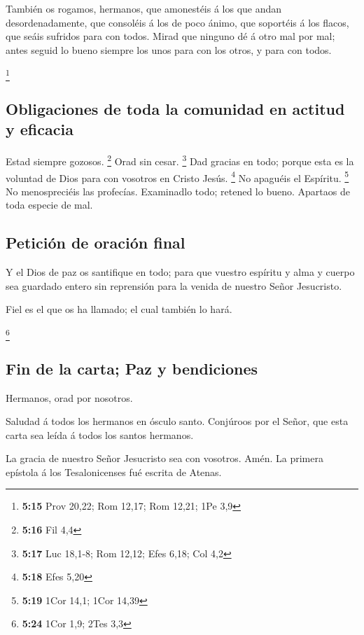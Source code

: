  También os rogamos, hermanos, que amonestéis á los que
andan desordenadamente, que consoléis á los de poco ánimo, que soportéis
á los flacos, que seáis sufridos para con todos.  Mirad que
ninguno dé á otro mal por mal; antes seguid lo bueno siempre los unos
para con los otros, y para con todos.

\footnote{\textbf{5:15} Prov 20,22; Rom 12,17; Rom 12,21; 1Pe 3,9}

\hypertarget{obligaciones-de-toda-la-comunidad-en-actitud-y-eficacia}{%
\subsection{Obligaciones de toda la comunidad en actitud y
eficacia}\label{obligaciones-de-toda-la-comunidad-en-actitud-y-eficacia}}

 Estad siempre gozosos. \footnote{\textbf{5:16} Fil 4,4}
 Orad sin cesar. \footnote{\textbf{5:17} Luc 18,1-8; Rom
  12,12; Efes 6,18; Col 4,2}  Dad gracias en todo; porque
esta es la voluntad de Dios para con vosotros en Cristo Jesús.
\footnote{\textbf{5:18} Efes 5,20}  No apaguéis el
Espíritu. \footnote{\textbf{5:19} 1Cor 14,1; 1Cor 14,39} 
No menospreciéis las profecías.  Examinadlo todo; retened
lo bueno.  Apartaos de toda especie de mal.

\hypertarget{peticiuxf3n-de-oraciuxf3n-final}{%
\subsection{Petición de oración
final}\label{peticiuxf3n-de-oraciuxf3n-final}}

 Y el Dios de paz os santifique en todo; para que vuestro
espíritu y alma y cuerpo sea guardado entero sin reprensión para la
venida de nuestro Señor Jesucristo.

 Fiel es el que os ha llamado; el cual también lo hará.

\footnote{\textbf{5:24} 1Cor 1,9; 2Tes 3,3}

\hypertarget{fin-de-la-carta-paz-y-bendiciones}{%
\subsection{Fin de la carta; Paz y
bendiciones}\label{fin-de-la-carta-paz-y-bendiciones}}

 Hermanos, orad por nosotros.

 Saludad á todos los hermanos en ósculo santo.
 Conjúroos por el Señor, que esta carta sea leída á todos
los santos hermanos.

 La gracia de nuestro Señor Jesucristo sea con vosotros.
Amén. La primera epístola á los Tesalonicenses fué escrita de Atenas.
